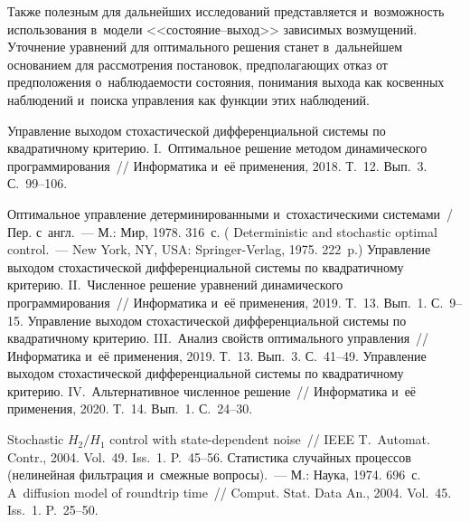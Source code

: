\begin{multicols}{2}
     Также полезным для дальнейших исследований представляется 
и~возможность использования в~модели <<со\-сто\-яние--вы\-ход>> 
зависимых возмущений. Уточнение уравнений для оптимального решения 
станет в~дальнейшем основанием для рассмотрения постановок, 
предполагающих отказ от предположения о~наблюдаемости со\-сто\-яния, 
понимания выхода как косвенных наблюдений и~поиска управ\-ле\-ния как 
функции этих наблюдений.

{\small\frenchspacing
{%
\begin{thebibliography}{9}
 Управление выходом 
стохастической дифференциальной системы по квадратичному критерию. 
I.~Оптимальное решение методом динамического программирования~// 
Информатика и~её применения, 2018. Т.~12. Вып.~3. С.~99--106.

 Оптимальное управление 
детерминированными и~стохастическими системами~/ Пер. с~англ.~--- М.: 
Мир, 1978. 316~с. ( Deterministic and 
stochastic optimal control.~--- New York, NY, USA: Springer-Verlag, 1975. 
222~p.)
 Управление выходом 
стохастической дифференциальной системы по квадратичному критерию. 
II.~Численное решение уравнений динамического программирования~// 
Информатика и~её применения, 2019. Т.~13. Вып.~1. С.~9--15.
 Управление выходом 
стохастической дифференциальной системы по квадратичному критерию. 
III.~Анализ свойств оптимального управления~// Информатика и~её 
применения, 2019. Т.~13. Вып.~3. С.~41--49.
 Управление выходом 
стохастической дифференциальной системы по квадратичному критерию. 
IV.~Альтернативное численное решение~// Информатика и~её 
применения, 2020. Т.~14. Вып.~1. С.~24--30.

 Stochastic $H_2/H_1$ control with state-dependent 
noise~// IEEE T.~Automat. Contr., 2004. Vol.~49. Iss.~1. P.~45--56.
 Статистика случайных процессов 
(нелинейная фильтрация и~смежные вопросы).~--- М.: Наука, 1974. 696~с.
 A~diffusion model of roundtrip time~// 
Comput. Stat. Data An., 2004. Vol.~45. Iss.~1. P.~25--50.
\end{thebibliography}
}
}
\end{multicols}

